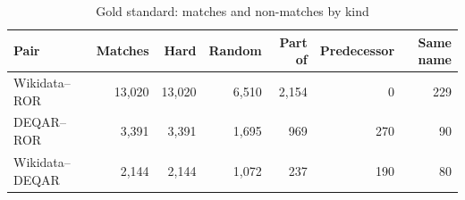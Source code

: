 \begin{table}[t]
\caption{Gold standard: matches and non-matches by kind}\label{tab:gold}
\scriptsize
\setlength{\tabcolsep}{4pt}
\begin{tabular}{lrrrrrr}
\toprule
Pair & Matches & Hard & Random & Part of & Predecessor & Same name\\
\midrule
Wikidata--ROR & 13{,}020 & 13{,}020 & 6{,}510 & 2{,}154 & 0 & 229\\
DEQAR--ROR & 3{,}391 & 3{,}391 & 1{,}695 & 969 & 270 & 90\\
Wikidata--DEQAR & 2{,}144 & 2{,}144 & 1{,}072 & 237 & 190 & 80\\
\bottomrule
\end{tabular}
\end{table}
